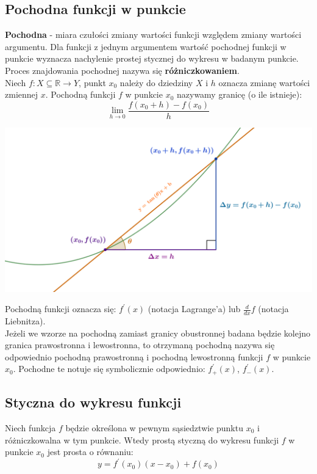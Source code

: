 \documentclass[14pt,a4paper]{extarticle}
\begin{document}
\subsection{Pochodna funkcji w punkcie}
\noindent\textbf{Pochodna} - miara czułości zmiany wartości funkcji względem zmiany wartości
argumentu. Dla funkcji z jednym argumentem wartość pochodnej funkcji w punkcie wyznacza nachylenie
prostej stycznej do wykresu w badanym punkcie. Proces znajdowania pochodnej nazywa się \textbf{różniczkowaniem}.\hfill\break\\

\noindent Niech $f: X \subseteq \mathbb{R} \rightarrow Y$, punkt $x_{0}$ należy do dziedziny $X$ i $h$ oznacza zmianę wartości zmiennej $x$.
Pochodną funkcji $f$ w punkcie $x_{0}$ nazywamy granicę (o ile istnieje):
$$\lim_{h \to 0}\frac{f(x_{0} + h) - f(x_{0})}{h}$$
\begin{center}
\includegraphics[scale=0.4]{definicja pochodna w punkcie.png}
\end{center}
\noindent Pochodną funkcji oznacza się: $f^{\prime}(x)$ (notacja Lagrange'a) lub $\frac{d}{d x} f$ (notacja Liebnitza).\hfill\break\\
\noindent Jeżeli we wzorze na pochodną zamiast granicy obustronnej badana będzie kolejno granica
prawostronna i lewostronna, to otrzymaną pochodną nazywa się odpowiednio pochodną prawostronną i pochodną lewostronną
funkcji $f$ w punkcie $x_{0}$. Pochodne te notuje się symbolicznie odpowiednio: $f^{\prime}_{+}(x)$, $f^{\prime}_{-}(x)$.\\

\subsection{Styczna do wykresu funkcji}
Niech funkcja $f$ będzie określona w pewnym sąsiedztwie punktu $x_{0}$ i różniczkowalna w tym punkcie.
Wtedy prostą styczną do wykresu funkcji $f$ w punkcie $x_{0}$ jest prosta o równaniu:
$$y = f^{\prime}(x_{0})(x - x_{0}) + f(x_{0})$$
\end{document}
